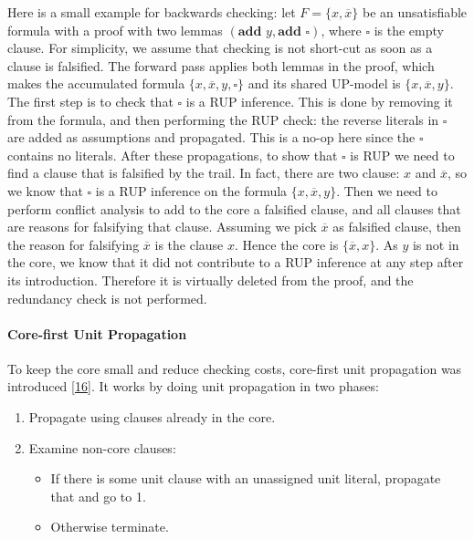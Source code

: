 \documentclass[
]{report}
\providecommand{\tightlist}{%
  \setlength{\itemsep}{0pt}\setlength{\parskip}{0pt}}
\begin{document}
Here is a small example for backwards checking: let
\(F = \{x, \overline{x}\}\) be an unsatisfiable formula with a proof
with two lemmas \((\textbf{add } y, \textbf{add } \square)\), where
\(\square\) is the empty clause. For simplicity, we assume that checking
is not short-cut as soon as a clause is falsified. The forward pass
applies both lemmas in the proof, which makes the accumulated formula
\(\{x, \overline{x}, y, \square\}\) and its shared UP-model is
\(\{x, \overline{x}, y\}\). The first step is to check that \(\square\)
is a RUP inference. This is done by removing it from the formula, and
then performing the RUP check: the reverse literals in \(\square\) are
added as assumptions and propagated. This is a no-op here since the
\(\square\) contains no literals. After these propagations, to show that
\(\square\) is RUP we need to find a clause that is falsified by the
trail. In fact, there are two clause: \(x\) and \(\overline{x}\), so we
know that \(\square\) is a RUP inference on the formula
\(\{x, \overline{x}, y\}\). Then we need to perform conflict analysis to
add to the core a falsified clause, and all clauses that are reasons for
falsifying that clause. Assuming we pick \(\overline{x}\) as falsified
clause, then the reason for falsifying \(\overline{x}\) is the clause
\(x\). Hence the core is \(\{\overline{x}, x\}\). As \(y\) is not in the
core, we know that it did not contribute to a RUP inference at any step
after its introduction. Therefore it is virtually deleted from the
proof, and the redundancy check is not performed.

\paragraph{Core-first Unit Propagation}

To keep the core small and reduce checking costs, core-first unit
propagation was introduced {[}\protect\hyperlink{ref-Heule_2013}{16}{]}.
It works by doing unit propagation in two phases:

\begin{enumerate}
\def\labelenumi{\arabic{enumi}.}
\tightlist
\item
  Propagate using clauses already in the core.
\item
  Examine non-core clauses:

  \begin{itemize}
  \tightlist
  \item
    If there is some unit clause with an unassigned unit literal,
    propagate that and go to 1.
  \item
    Otherwise terminate.
  \end{itemize}
\end{enumerate}
\end{document}
